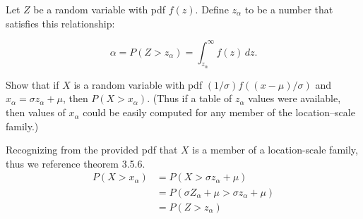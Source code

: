\documentclass[12pt,letterpaper]{exam}
\begin{document}
\begin{questions}
\begin{solution}
		
	\end{solution}
	\clearpage
	
	\setcounter{question}{37}
	\question 
	Let \(Z\) be a random variable with pdf \(f(z)\). Define \(z_\alpha\) to be a number that satisfies this relationship:
	
	\[\alpha = P(Z>z_\alpha) = \int_{z_\alpha}^{\infty} f(z) \,dz.\]
	
	Show that if \(X\) is a random variable with pdf \((1/\sigma)f((x-\mu)/\sigma)\) and \(x_\alpha=\sigma z_\alpha+\mu\),
	then \(P(X>x_\alpha)\).	(Thus if a table of \(z_\alpha\) values were available, then values of \(x_\alpha\) 
	could be easily computed for any member of the location–scale family.)
	
	\begin{solution}
		Recognizing from the provided pdf that \(X\) is a member of a location-scale family,
		thus we reference theorem 3.5.6.
		\begin{align*}
			P(X>x_\alpha)
			&= P(X> \sigma z_\alpha+\mu ) \\
			&= P(\sigma Z_\alpha+\mu> \sigma z_\alpha+\mu ) \\
			&= P(Z> z_\alpha ) \\
		\end{align*}
	\end{solution}
	

\end{questions}
\end{document}
